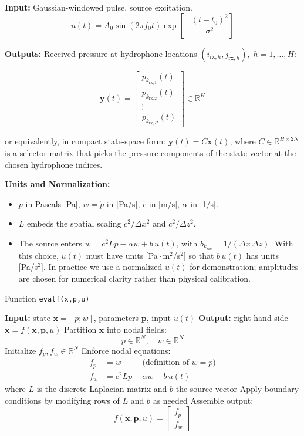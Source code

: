 \documentclass[11pt]{article}
\begin{document}
\textbf{Input:} Gaussian-windowed pulse, source excitation.
\[
u(t) = A_0 \sin(2\pi f_0 t) \exp\!\left[-\frac{(t-t_0)^2}{\sigma^2}\right]
\]

\textbf{Outputs:} Received pressure at hydrophone locations $(i_{\mathrm{rx},h},j_{\mathrm{rx},h}), \; h=1,\dots,H$:

\[
\mathbf{y}(t) = 
\begin{bmatrix}
p_{k_{\mathrm{rx},1}}(t) \\
p_{k_{\mathrm{rx},2}}(t) \\
\vdots \\
p_{k_{\mathrm{rx},H}}(t)
\end{bmatrix}
\in \mathbb{R}^{H}
\]

or equivalently, in compact state-space form: $\mathbf{y}(t) = C \mathbf{x}(t)$, where $C \in \mathbb{R}^{H \times 2N}$ is a selector matrix that picks the pressure components of the state vector at the chosen hydrophone indices.

\textbf{Units and Normalization:}
\begin{itemize}
    \item $p$ in Pascals [Pa], $w=\dot p$ in [Pa/s], $c$ in [m/s], $\alpha$ in [1/s].
    \item $L$ embeds the spatial scaling $c^2/\Delta x^2$ and $c^2/\Delta z^2$.
    \item The source enters $\dot w = c^2 L p - \alpha w + b\,u(t)$, with $b_{k_\mathrm{src}} = 1/(\Delta x\,\Delta z)$. With this choice, $u(t)$ must have units [Pa\,$\cdot$\,m$^2$/s$^2$] so that $b\,u(t)$ has units [Pa/s$^2$]. In practice we use a normalized $u(t)$ for demonstration; amplitudes are chosen for numerical clarity rather than physical calibration.
\end{itemize}

\newpage

\begin{algorithm}[h]
\caption{Function \texttt{evalf(x,p,u)}}
\begin{algorithmic}[1]
\State \textbf{Input:} state $\mathbf{x} = [p;w]$, parameters $\mathbf{p}$, input $u(t)$
\State \textbf{Output:} right-hand side $\dot{\mathbf{x}} = f(\mathbf{x},\mathbf{p},u)$
\vspace{6pt}
\State Partition $\mathbf{x}$ into nodal fields:
\[
p \in \mathbb{R}^N, \quad w \in \mathbb{R}^N
\]
\State Initialize $f_p, f_w \in \mathbb{R}^N$
\State Enforce nodal equations:
\begin{align*}
f_p &= w \qquad \;\; \text{(definition of $w=\dot p$)} \\
f_w &= c^2 L p - \alpha w + b\,u(t)
\end{align*}
where $L$ is the discrete Laplacian matrix and $b$ the source vector
\State Apply boundary conditions by modifying rows of $L$ and $b$ as needed
\State Assemble output:
\[
f(\mathbf{x},\mathbf{p},u) =
\begin{bmatrix}
f_p \\ f_w
\end{bmatrix}
\]
\end{algorithmic}
\end{algorithm}
\end{document}
